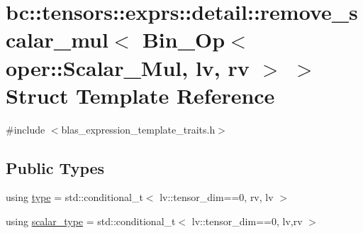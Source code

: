 \hypertarget{structbc_1_1tensors_1_1exprs_1_1detail_1_1remove__scalar__mul_3_01Bin__Op_3_01oper_1_1Scalar__Mul_00_01lv_00_01rv_01_4_01_4}{}\section{bc\+:\+:tensors\+:\+:exprs\+:\+:detail\+:\+:remove\+\_\+scalar\+\_\+mul$<$ Bin\+\_\+\+Op$<$ oper\+:\+:Scalar\+\_\+\+Mul, lv, rv $>$ $>$ Struct Template Reference}
\label{structbc_1_1tensors_1_1exprs_1_1detail_1_1remove__scalar__mul_3_01Bin__Op_3_01oper_1_1Scalar__Mul_00_01lv_00_01rv_01_4_01_4}


{\ttfamily \#include $<$blas\+\_\+expression\+\_\+template\+\_\+traits.\+h$>$}

\subsection*{Public Types}
\begin{DoxyCompactItemize}
\item 
using \hyperlink{structbc_1_1tensors_1_1exprs_1_1detail_1_1remove__scalar__mul_3_01Bin__Op_3_01oper_1_1Scalar__Mul_00_01lv_00_01rv_01_4_01_4_ae82759eac7760c962640683384337bc1}{type} = std\+::conditional\+\_\+t$<$ lv\+::tensor\+\_\+dim==0, rv, lv $>$
\item 
using \hyperlink{structbc_1_1tensors_1_1exprs_1_1detail_1_1remove__scalar__mul_3_01Bin__Op_3_01oper_1_1Scalar__Mul_00_01lv_00_01rv_01_4_01_4_a0bad779738ad8a0a4bd854a6f68dff7c}{scalar\+\_\+type} = std\+::conditional\+\_\+t$<$ lv\+::tensor\+\_\+dim==0, lv,rv $>$
\end{DoxyCompactItemize}
